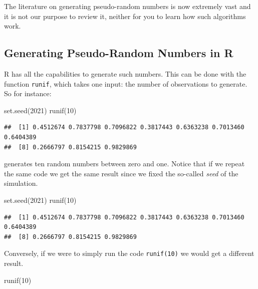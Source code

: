 \documentclass[
]{book}
\newenvironment{Shaded}{\begin{snugshade}}{\end{snugshade}}
\newcommand{\DecValTok}[1]{\textcolor[rgb]{0.00,0.00,0.81}{#1}}
\newcommand{\FunctionTok}[1]{\textcolor[rgb]{0.00,0.00,0.00}{#1}}
\newcommand{\NormalTok}[1]{#1}
\theoremstyle{definition}
\theoremstyle{definition}
\theoremstyle{definition}
\theoremstyle{definition}
\theoremstyle{remark}
\begin{document}
The literature on generating pseudo-random numbers is now extremely vast and it is not our purpose to review it, neither for you to learn how such algorithms work.

\hypertarget{generating-pseudo-random-numbers-in-r}{%
\subsection{Generating Pseudo-Random Numbers in R}\label{generating-pseudo-random-numbers-in-r}}

R has all the capabilities to generate such numbers. This can be done with the function \texttt{runif}, which takes one input: the number of observations to generate. So for instance:

\begin{Shaded}
\begin{Highlighting}[]
\FunctionTok{set.seed}\NormalTok{(}\DecValTok{2021}\NormalTok{)}
\FunctionTok{runif}\NormalTok{(}\DecValTok{10}\NormalTok{)}
\end{Highlighting}
\end{Shaded}

\begin{verbatim}
##  [1] 0.4512674 0.7837798 0.7096822 0.3817443 0.6363238 0.7013460 0.6404389
##  [8] 0.2666797 0.8154215 0.9829869
\end{verbatim}

generates ten random numbers between zero and one. Notice that if we repeat the same code we get the same result since we fixed the so-called \emph{seed} of the simulation.

\begin{Shaded}
\begin{Highlighting}[]
\FunctionTok{set.seed}\NormalTok{(}\DecValTok{2021}\NormalTok{)}
\FunctionTok{runif}\NormalTok{(}\DecValTok{10}\NormalTok{)}
\end{Highlighting}
\end{Shaded}

\begin{verbatim}
##  [1] 0.4512674 0.7837798 0.7096822 0.3817443 0.6363238 0.7013460 0.6404389
##  [8] 0.2666797 0.8154215 0.9829869
\end{verbatim}

Conversely, if we were to simply run the code \texttt{runif(10)} we would get a different result.

\begin{Shaded}
\begin{Highlighting}[]
\FunctionTok{runif}\NormalTok{(}\DecValTok{10}\NormalTok{)}
\end{Highlighting}
\end{Shaded}
\end{document}
